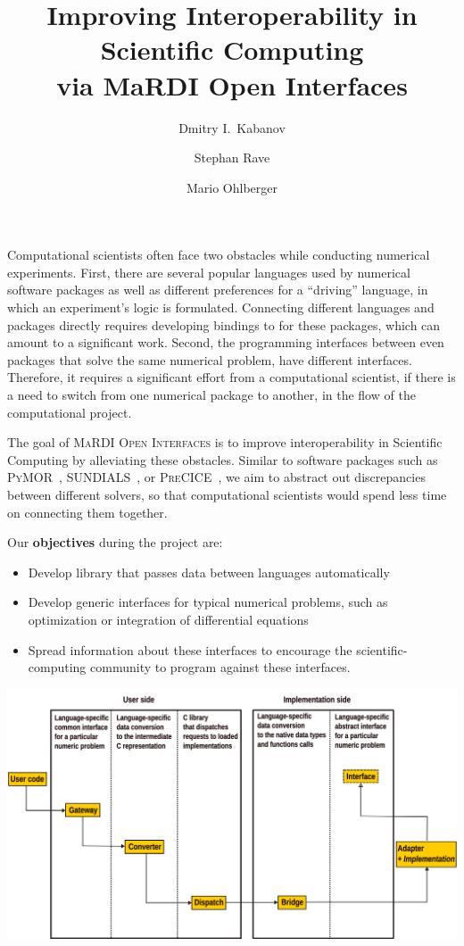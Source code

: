 \documentclass[a0paper, twocolumn, csc, english, final]{mpi2015_poster}
\title{Improving Interoperability in Scientific Computing\\via MaRDI Open Interfaces}
\author{Dmitry I.\ Kabanov}
\author{Stephan Rave}
\author{Mario Ohlberger}
\affil{Institute for Analysis and Numerics, University of Münster, Münster, Germany}
\newcommand{\OIF}{\textsc{MaRDI Open Interfaces}\xspace}
\begin{document}
\begin{poster}
  \begin{pcolumn}
    \begin{pbox}
      \large
      Computational scientists often face two obstacles while conducting
      numerical experiments.
      First, there are several popular languages used by numerical
      software packages as well as different preferences for a ``driving''
      language, in which an experiment's logic is formulated.
      Connecting different languages and packages directly requires
      developing bindings to for these packages, which can amount
      to a significant work.
      Second, the programming interfaces between even packages
      that solve the same numerical problem, have different interfaces.
      Therefore, it requires a significant effort from a computational
      scientist, if there is a need to switch from one numerical package
      to another, in the flow of the computational project.

      The goal of \OIF{} is to improve interoperability in Scientific
      Computing by alleviating these obstacles.
      Similar to software packages such as \textsc{PyMOR}~\citep{Milk2016},
      \textsc{SUNDIALS}~\citep{GardnerEtAl2022},
      or \textsc{PreCICE}~\citep{Chourdakis2022},
      we aim to abstract out discrepancies between
      different solvers, so that computational scientists would spend less time
      on connecting them together.

      Our \textbf{objectives} during the project are:
      \begin{itemize}
        \item Develop library that passes data between languages automatically
        \item Develop generic interfaces for typical numerical problems,
              such as optimization or integration of differential equations
        \item Spread information about these interfaces to encourage
              the scientific-computing community to program against these interfaces.
      \end{itemize}
    \end{pbox}

    \begin{pbox}
      \large
      \includegraphics[width=\columnwidth]{arch}


\end{pbox}
\end{pcolumn}
\end{poster}
\end{document}
